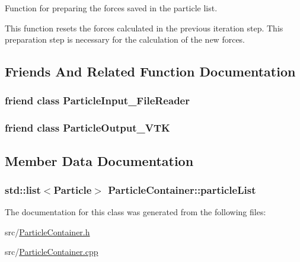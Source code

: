 Function for preparing the forces saved in the particle list. 

This function resets the forces calculated in the previous iteration step. This preparation step is necessary for the calculation of the new forces. 

\subsection{Friends And Related Function Documentation}
\hypertarget{classParticleContainer_a7c0d8a2d97fdcd7711b15cc13e5b31c9}{
\subsubsection[{Particle\-Input\-\_\-\-File\-Reader}]{\setlength{\rightskip}{0pt plus 5cm}friend class {\bf Particle\-Input\-\_\-\-File\-Reader}\hspace{0.3cm}{\ttfamily [friend]}}}\label{classParticleContainer_a7c0d8a2d97fdcd7711b15cc13e5b31c9}
\hypertarget{classParticleContainer_a90fad3b5eb61cdccf67f618b72f5a767}{
\subsubsection[{Particle\-Output\-\_\-\-V\-T\-K}]{\setlength{\rightskip}{0pt plus 5cm}friend class {\bf Particle\-Output\-\_\-\-V\-T\-K}\hspace{0.3cm}{\ttfamily [friend]}}}\label{classParticleContainer_a90fad3b5eb61cdccf67f618b72f5a767}


\subsection{Member Data Documentation}
\hypertarget{classParticleContainer_a037012a8f2e872258702209261d8f10e}{
\subsubsection[{particle\-List}]{\setlength{\rightskip}{0pt plus 5cm}std\-::list$<${\bf Particle}$>$ Particle\-Container\-::particle\-List\hspace{0.3cm}{\ttfamily [private]}}}\label{classParticleContainer_a037012a8f2e872258702209261d8f10e}


The documentation for this class was generated from the following files\-:\begin{DoxyCompactItemize}
\item 
src/\hyperlink{ParticleContainer_8h}{Particle\-Container.\-h}\item 
src/\hyperlink{ParticleContainer_8cpp}{Particle\-Container.\-cpp}\end{DoxyCompactItemize}
